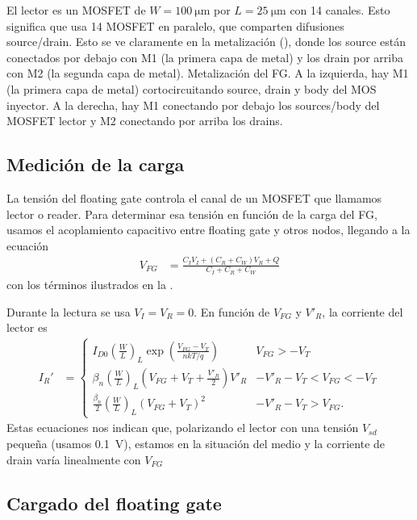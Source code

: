 El lector es un MOSFET de $W=\SI{100}{\micro\meter}$ 
por $L=\SI{25}{\micro\meter}$ con 14 canales.
Esto significa que usa 14 MOSFET en paralelo,
que comparten difusiones source/drain. 
Esto se ve claramente en la metalización (),
donde los source están conectados por debajo con M1 (la primera capa de metal)
y los drain por arriba con M2 (la segunda capa de metal).
{Metalización del FG.
A la izquierda, hay M1 (la primera capa de metal) 
cortocircuitando source, drain y body del MOS inyector.
A la derecha, hay M1 conectando por debajo los sources/body del MOSFET lector
y M2 conectando por arriba los drains.}
\subsection{Medición de la carga}
La tensión del floating gate controla el canal de un MOSFET
que llamamos lector o reader.
Para determinar esa tensión en función de la carga del FG,
usamos el acoplamiento capacitivo
entre floating gate y otros nodos, llegando a la ecuación
\begin{align*}
    V_{FG} &= \frac{C_I V_I + (C_R+C_W) V_R + Q}{C_I+C_R+C_W}
\end{align*}
con los términos ilustrados en la .

Durante la lectura se usa $V_I=V_R=0$.
En función de $V_{FG}$ y $V'_R$, la corriente del lector es
\begin{align*}
    I_R' &= \begin{cases}
        I_{D0} \left(\frac W L\right)_L
        \exp\left(\frac{V_{FG}-V_T}{nkT/q}\right)& V_{FG}>-V_T\\
        \beta_n\left(\frac W L\right)_L(V_{FG}+V_T+\frac{V'_R}2)V'_R &
        -V'_R-V_T<V_{FG}<-V_T\\
        \frac{\beta_n}2\left(\frac W L\right)_L(V_{FG}+V_T)^2 &
        -V'_R-V_T>V_{FG}.
    \end{cases}
\end{align*}
Estas ecuaciones nos indican que,
polarizando el lector con una tensión $V_{sd}$ pequeña
(usamos \SI{0.1}{\volt}),
estamos en la situación del medio y
la corriente de drain varía linealmente con $V_{FG}$
\subsection{Cargado del floating gate}
%
